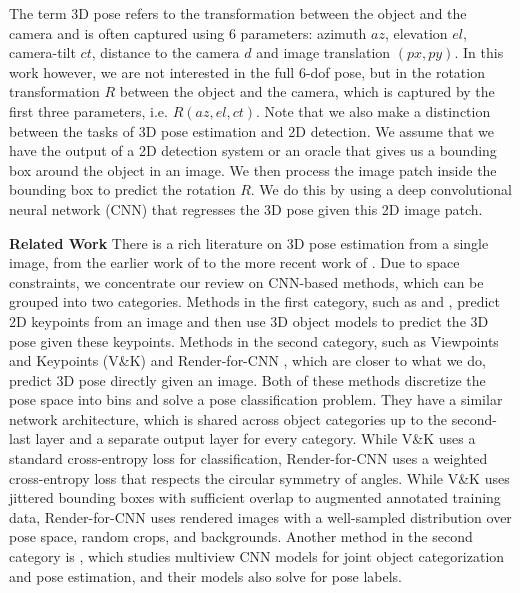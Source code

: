 \documentclass[10pt,twocolumn,letterpaper]{article}
\newcommand{\myparagraph}[1]{\smallskip\noindent\textbf{#1}}
\begin{document}
	The term 3D pose refers to the transformation between the object and the camera and is often captured using 6 parameters: azimuth $az$, elevation $el$, camera-tilt $ct$, distance to the camera $d$ and image translation $(px, py)$. In this work however, we are not interested in the full 6-dof pose, but in the rotation transformation $R$ between the object and the camera, which is captured by the first three parameters, i.e. $R(az, el, ct)$. Note that we also make a distinction between the tasks of 3D pose estimation and 2D detection. We assume that we have the output of a 2D detection system or an oracle that gives us a bounding box around the object in an image. We then process the image patch inside the bounding box to predict the rotation $R$. We do this by using a deep convolutional neural network (CNN) that regresses the 3D pose given this 2D image patch. 
	
	\myparagraph{Related Work} There is a rich literature on 3D pose estimation from a single image, from the earlier work of \cite{Schneiderman-Kanade:CVPR00} to the more recent work of \cite{Pepik:CVPR12, Hejrati:CVPR14}. Due to space constraints, we concentrate our review on CNN-based methods, which can be grouped into two categories. Methods in the first category, such as \cite{Wu:ECCV16} and \cite{Pavlakos:ICRA17}, predict 2D keypoints from an image and then use 3D object models to predict the 3D pose given these keypoints. Methods in the second category, such as Viewpoints and Keypoints (V\&K)\cite{Tulsiani:CVPR15} and Render-for-CNN \cite{Su:ICCV15}, which are closer to what we do, predict 3D pose directly given an image. Both of these methods discretize the pose space into bins and solve a pose classification problem. They have a similar network architecture, which is shared across object categories up to the second-last layer and a separate output layer for every category. While V\&K \cite{Tulsiani:CVPR15} uses a standard cross-entropy loss for classification, Render-for-CNN \cite{Su:ICCV15} uses a weighted cross-entropy loss that respects the circular symmetry of angles. While V\&K \cite{Tulsiani:CVPR15} uses jittered bounding boxes with sufficient overlap to augmented annotated training data, Render-for-CNN \cite{Su:ICCV15} uses rendered images with a well-sampled distribution over pose space, random crops, and backgrounds. Another method in the second category is \cite{Elhoseiny:ICML16}, which studies multiview CNN models for joint object categorization and pose estimation, and their models also solve for pose labels. 
	
\end{document}
